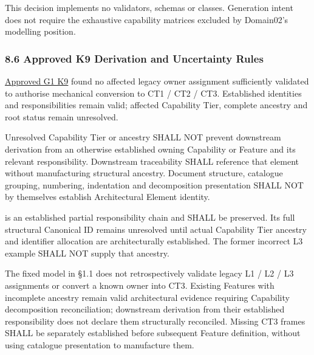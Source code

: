 This decision implements no validators, schemas or classes. Generation intent does not require the exhaustive capability matrices excluded by Domain02's modelling position.

\label{rad:metamodel:435}



\label{rad:metamodel:437}
\subsubsection*{8.6 Approved K9 Derivation and Uncertainty Rules}
\label{rad:metamodel:439}

\hyperref[rad:k9:1392]{Approved G1 K9} found no affected legacy owner assignment sufficiently validated to authorise mechanical conversion to CT1 /\allowbreak{} CT2 /\allowbreak{} CT3. Established identities and responsibilities remain valid; affected Capability Tier, complete ancestry and root status remain unresolved.

\label{rad:metamodel:441}

Unresolved Capability Tier or ancestry SHALL NOT prevent downstream derivation from an otherwise established owning Capability or Feature and its relevant responsibility. Downstream traceability SHALL reference that element without manufacturing structural ancestry. Document structure, catalogue grouping, numbering, indentation and decomposition presentation SHALL NOT by themselves establish Architectural Element identity.

\label{rad:metamodel:443}

\texttt{} is an established partial responsibility chain and SHALL be preserved. Its full structural Canonical ID remains unresolved until actual Capability Tier ancestry and identifier allocation are architecturally established. The former incorrect L3 example SHALL NOT supply that ancestry.

\label{rad:metamodel:445}

The fixed model in §1.1 does not retrospectively validate legacy L1 /\allowbreak{} L2 /\allowbreak{} L3 assignments or convert a known owner into CT3. Existing Features with incomplete ancestry remain valid architectural evidence requiring Capability decomposition reconciliation; downstream derivation from their established responsibility does not declare them structurally reconciled. Missing CT3 frames SHALL be separately established before subsequent Feature definition, without using catalogue presentation to manufacture them.

